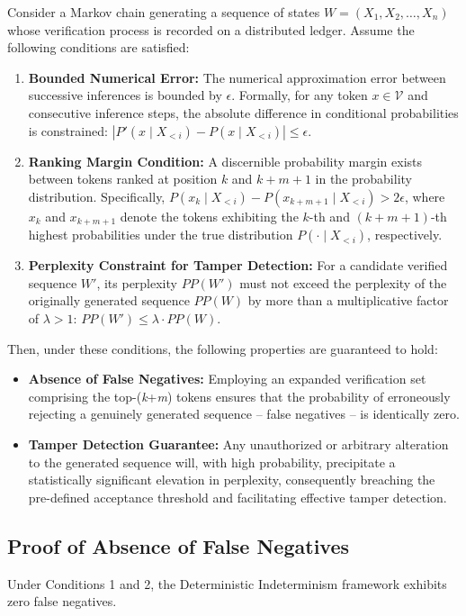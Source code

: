 \documentclass{article}
\begin{document}
Consider a Markov chain generating a sequence of states \( W = (X_1, X_2, \ldots, X_n) \) whose verification process is recorded on a distributed ledger. Assume the following conditions are satisfied:
\begin{enumerate}
    \item \textbf{Bounded Numerical Error:}  The numerical approximation error between successive inferences is bounded by \(\epsilon\). Formally, for any token \(x \in \mathcal{V}\) and consecutive inference steps, the absolute difference in conditional probabilities is constrained: \(|P'(x \mid X_{<i}) - P(x \mid X_{<i})| \leq \epsilon\).
    \item \textbf{Ranking Margin Condition:}  A discernible probability margin exists between tokens ranked at position \(k\) and \(k+m+1\) in the probability distribution. Specifically, \(P(x_k \mid X_{<i}) - P(x_{k+m+1} \mid X_{<i}) > 2\epsilon\), where \(x_k\) and \(x_{k+m+1}\) denote the tokens exhibiting the \(k\)-th and \((k+m+1)\)-th highest probabilities under the true distribution \(P(\cdot \mid X_{<i})\), respectively.
    \item \textbf{Perplexity Constraint for Tamper Detection:} For a candidate verified sequence \( W' \), its perplexity \( PP(W') \) must not exceed the perplexity of the originally generated sequence \( PP(W) \) by more than a multiplicative factor of \( \lambda > 1 \): \(PP(W') \leq \lambda \cdot PP(W)\).
\end{enumerate}
Then, under these conditions, the following properties are guaranteed to hold:
\begin{itemize}
    \item \textbf{Absence of False Negatives:}  Employing an expanded verification set comprising the top-(\textit{k}+\textit{m}) tokens ensures that the probability of erroneously rejecting a genuinely generated sequence -- false negatives -- is identically zero.
    \item \textbf{Tamper Detection Guarantee:}  Any unauthorized or arbitrary alteration to the generated sequence will, with high probability, precipitate a statistically significant elevation in perplexity, consequently breaching the pre-defined acceptance threshold and facilitating effective tamper detection.
\end{itemize}


\subsection*{Proof of Absence of False Negatives}
Under Conditions 1 and 2, the Deterministic Indeterminism framework exhibits zero false negatives.
\end{document}
